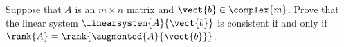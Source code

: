 Suppose that $A$ is an $m\times n$ matrix and $\vect{b}\in\complex{m}$.  Prove that the linear system $\linearsystem{A}{\vect{b}}$ is consistent if and only if $\rank{A}=\rank{\augmented{A}{\vect{b}}}$.